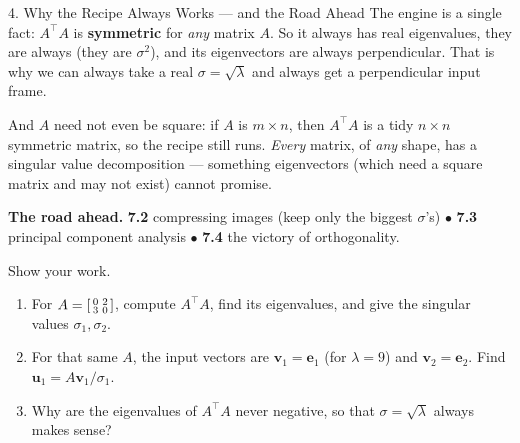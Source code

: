 \documentclass[10pt]{article}
\newcommand{\uu}{\mathbf{u}}
\newcommand{\vv}{\mathbf{v}}
\newcommand{\ee}{\mathbf{e}}
\newcommand{\T}{^{\top}}
\begin{document}
\begin{notesbox}{4. Why the Recipe Always Works --- and the Road Ahead}
The engine is a single fact: $A\T A$ is \textbf{symmetric} for \emph{any} matrix $A$. So it always has
real eigenvalues, they are always \blank{2.4cm} (they are $\sigma^2$), and its eigenvectors are always
perpendicular. That is why we can always take a real $\sigma=\sqrt{\lambda}$ and always get a
perpendicular input frame.

\vspace{2pt}
And $A$ need not even be square: if $A$ is $m\times n$, then $A\T A$ is a tidy $n\times n$ symmetric
matrix, so the recipe still runs. \emph{Every} matrix, of \emph{any} shape, has a singular value
decomposition --- something eigenvectors (which need a square matrix and may not exist) cannot promise.

\vspace{2pt}
\textbf{The road ahead.} \textbf{7.2} compressing images (keep only the biggest $\sigma$'s)\; $\bullet$\;
\textbf{7.3} principal component analysis\; $\bullet$\; \textbf{7.4} the victory of orthogonality.
\end{notesbox}

\begin{practicebox}
Show your work.
\begin{enumerate}[leftmargin=1.6em, itemsep=4pt]
  \item For $A=\begin{bsmallmatrix} 0 & 2\\ 3 & 0 \end{bsmallmatrix}$, compute $A\T A$, find its eigenvalues, and give the singular values $\sigma_1,\sigma_2$. \writeline
  \item For that same $A$, the input vectors are $\vv_1=\ee_1$ (for $\lambda=9$) and $\vv_2=\ee_2$. Find $\uu_1=A\vv_1/\sigma_1$. \writeline
  \item Why are the eigenvalues of $A\T A$ never negative, so that $\sigma=\sqrt{\lambda}$ always makes sense? \writeline
\end{enumerate}
\end{practicebox}
\end{document}
